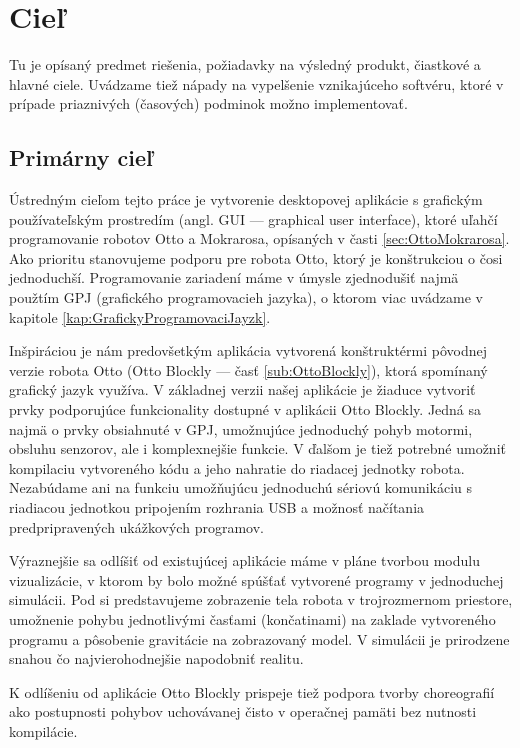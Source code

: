 \chapter{Cieľ}

\label{kap:ciel}

Tu je opísaný predmet riešenia, požiadavky na výsledný produkt, čiastkové a hlavné ciele. Uvádzame tiež nápady na vypelšenie vznikajúceho softvéru, ktoré v prípade priaznivých (časových) podminok možno implementovať.

\section{Primárny cieľ}
Ústredným cieľom tejto práce je vytvorenie desktopovej aplikácie s grafickým používateľským prostredím (angl. GUI --- graphical user interface), ktoré uľahčí programovanie robotov Otto a Mokrarosa, opísaných v časti \ref{sec:OttoMokrarosa}. Ako prioritu stanovujeme podporu pre robota Otto, ktorý je konštrukciou o čosi jednoduchší. Programovanie zariadení máme v úmysle zjednodušiť najmä použtím GPJ (grafického programovacieh jazyka), o ktorom viac uvádzame v kapitole \ref{kap:GrafickyProgramovaciJayzk}.

Inšpiráciou je nám predovšetkým aplikácia vytvorená konštruktérmi pôvodnej verzie robota Otto (Otto Blockly --- časť \ref{sub:OttoBlockly}), ktorá spomínaný grafický jazyk využíva. V základnej verzii našej aplikácie je žiaduce vytvoriť prvky podporujúce funkcionality dostupné v aplikácii Otto Blockly. Jedná sa najmä o prvky obsiahnuté v GPJ, umožnujúce jednoduchý pohyb motormi, obsluhu senzorov, ale i komplexnejšie funkcie. V ďalšom je tiež potrebné umožniť kompilaciu vytvoreného kódu a jeho nahratie do riadacej jednotky robota. Nezabúdame ani na funkciu umožňujúcu jednoduchú sériovú komunikáciu s riadiacou jednotkou pripojením rozhrania USB a možnosť načítania predpripravených ukážkových programov.

Výraznejšie sa odlíšiť od existujúcej aplikácie máme v pláne tvorbou modulu vizualizácie, v ktorom by bolo možné spúšťať vytvorené programy v jednoduchej simulácii. Pod  si predstavujeme zobrazenie tela robota v trojrozmernom priestore, umožnenie pohybu jednotlivými časťami (končatinami) na zaklade vytvoreného programu a pôsobenie gravitácie na zobrazovaný model. V simulácii je prirodzene snahou čo najvierohodnejšie napodobniť realitu.

K odlíšeniu od aplikácie Otto Blockly prispeje tiež podpora tvorby choreografií ako postupnosti pohybov uchovávanej čisto v operačnej pamäti bez nutnosti kompilácie.

